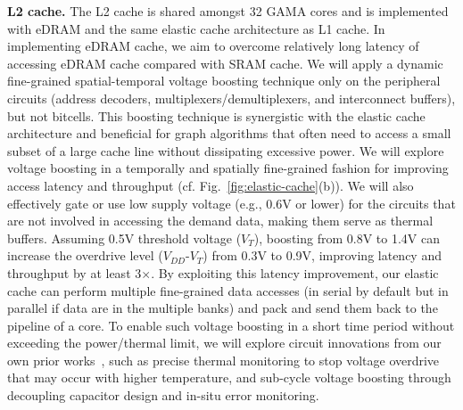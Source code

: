 \noindent
\textbf{L2 cache.}
The L2 cache is shared amongst 32 GAMA cores and is implemented with eDRAM and the same elastic cache architecture as L1 cache. 
In implementing eDRAM cache, we aim to overcome relatively long latency of accessing eDRAM cache compared with SRAM cache. 
We will apply a dynamic fine-grained spatial-temporal voltage boosting technique only on the peripheral circuits (address decoders, multiplexers/demultiplexers, and interconnect buffers), but not bitcells. 
This boosting technique is synergistic with the elastic cache architecture and beneficial for graph algorithms that often need to access a small subset of a large cache line without dissipating excessive power. 
We will explore voltage boosting in a temporally and spatially fine-grained fashion for improving access latency and throughput (cf. Fig.~\ref{fig:elastic-cache}(b)). 
We will also effectively gate or use low supply voltage (e.g., 0.6V or lower) for the circuits that are not involved in accessing the demand data, making them serve as thermal buffers. 
Assuming 0.5V threshold voltage ($V_T$), 
boosting from 0.8V to 1.4V can increase the overdrive level ($V_{DD}$-$V_T$) from 0.3V to 0.9V, improving latency and throughput by at least 3$\times$. 
By exploiting this latency improvement, our elastic cache can perform multiple fine-grained data accesses (in serial by default but in parallel if data are in the multiple banks) and pack and send them back to the pipeline of a core. 
To enable such voltage boosting in a short time period without exceeding the power/thermal limit, 
we will explore circuit innovations from our own prior works~\cite{yang2015compact,  Doyun2017, kim2014analysis}, such as precise thermal monitoring to stop voltage overdrive that may occur with higher temperature, and sub-cycle voltage boosting through decoupling capacitor design and in-situ error monitoring.


